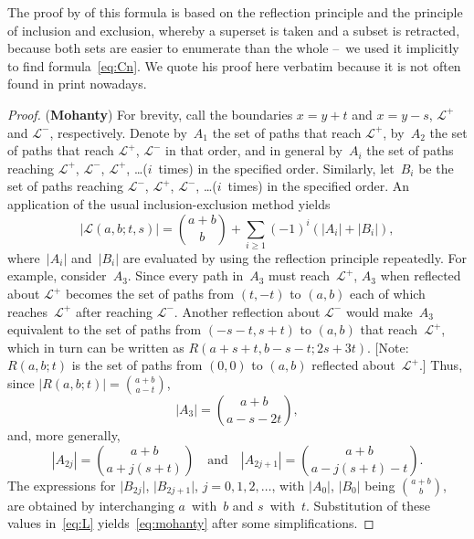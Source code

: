 The proof by \citet[p.~6]{Mohanty_1979} of this formula is based on
the reflection principle and the principle of inclusion and exclusion,
whereby a superset is taken and a subset is retracted, because both
sets are easier to enumerate than the whole --~we used it implicitly
to find formula~\eqref{eq:Cn}. We quote his proof here verbatim
because it is not often found in print nowadays.
\begin{proof}
  (\textbf{Mohanty}) For brevity, call the boundaries \(x=y+t\) and
  \(x=y-s\), \(\mathcal{L}^{+}\) and \(\mathcal{L}^{-}\),
  respectively. Denote by~\(A_1\) the set of paths that reach
  \(\mathcal{L}^{+}\), by~\(A_2\) the set of paths that reach
  \(\mathcal{L}^{+}\), \(\mathcal{L}^{-}\) in that order, and in
  general by~\(A_i\) the set of paths reaching \(\mathcal{L}^{+}\),
  \(\mathcal{L}^{-}\), \(\mathcal{L}^{+}\), \ldots (\(i\)~times) in
  the specified order. Similarly, let~\(B_i\) be the set of paths
  reaching \(\mathcal{L}^{-}\), \(\mathcal{L}^{+}\),
  \(\mathcal{L}^{-}\), \ldots (\(i\)~times) in the specified order. An
  application of the usual inclusion\--exclusion method yields
  \begin{equation}
    \left\lvert\mathcal{L}(a,b;t,s)\right\rvert = \binom{a+b}{b} +
    \sum_{i \geqslant 1}(-1)^{i}(\lvert{A_i}\rvert +
    \lvert{B_i}\rvert),\label{eq:L}
  \end{equation}
  where~\(\lvert{A_i}\rvert\) and~\(\lvert{B_i}\rvert\) are evaluated
  by using the reflection principle repeatedly. For example,
  consider~\(A_3\). Since every path in~\(A_3\) must
  reach~\(\mathcal{L}^{+}\), \(A_3\) when reflected about
  \(\mathcal{L}^{+}\) becomes the set of paths from \((t,-t)\) to
  \((a,b)\) each of which reaches~\(\mathcal{L}^{+}\) after reaching
  \(\mathcal{L}^{-}\). Another reflection about \(\mathcal{L}^{-}\)
  would make~\(A_3\) equivalent to the set of paths from
  \((-s-t,s+t)\) to \((a,b)\) that reach~\(\mathcal{L}^{+}\), which in
  turn can be written as \(R(a+s+t,b-s-t; 2s+3t)\). [Note:
    \(R(a,b;t)\) is the set of paths from \((0,0)\) to \((a,b)\)
    reflected about~\(\mathcal{L}^{+}\).] Thus, since
  \(\lvert{R(a,b;t)}\rvert = \binom{a+b}{a-t}\),
\begin{equation*}
\left\lvert{A_3}\right\rvert = \binom{a+b}{a-s-2t},
\end{equation*}
and, more generally,
\begin{equation*}
\left\lvert{A_{2j}}\right\rvert = \binom{a+b}{a+j(s+t)}
\quad\text{and}\quad
\left\lvert{A_{2j+1}}\right\rvert = \binom{a+b}{a-j(s+t)-t}.
\end{equation*}
The expressions for \(\lvert{B_{2j}}\rvert\),
\(\lvert{B_{2j+1}}\rvert\), \(j=0, 1, 2, \dots\), with
\(\lvert{A_0}\rvert\), \(\lvert{B_0}\rvert\) being \(\binom{a+b}{b}\),
are obtained by interchanging \(a\)~with~\(b\) and
\(s\)~with~\(t\). Substitution of these values in~\eqref{eq:L}
yields~\eqref{eq:mohanty} after some simplifications.
\end{proof}

